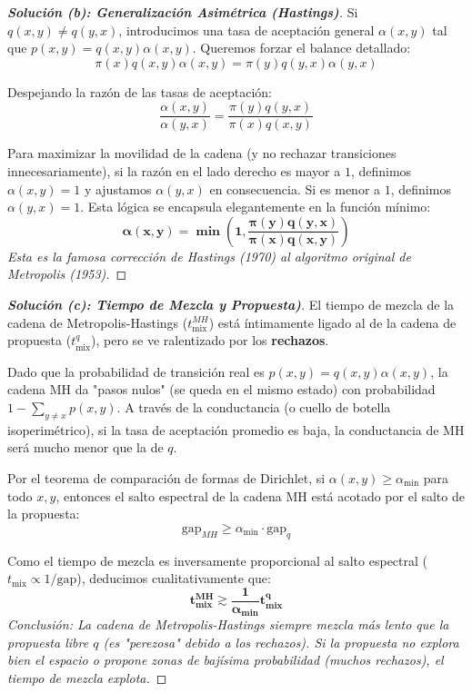 \documentclass[10pt,a4paper]{article}
\begin{document}
\vspace{5mm}

\begin{proof}[\textbf{Solución (b): Generalización Asimétrica (Hastings)}]
    Si $q(x,y) \neq q(y,x)$, introducimos una tasa de aceptación general $\alpha(x,y)$ tal que $p(x,y) = q(x,y)\alpha(x,y)$. Queremos forzar el balance detallado:
    \[ \pi(x) q(x,y) \alpha(x,y) = \pi(y) q(y,x) \alpha(y,x) \]
    
    Despejando la razón de las tasas de aceptación:
    \[ \frac{\alpha(x,y)}{\alpha(y,x)} = \frac{\pi(y) q(y,x)}{\pi(x) q(x,y)} \]
    
    Para maximizar la movilidad de la cadena (y no rechazar transiciones innecesariamente), si la razón en el lado derecho es mayor a $1$, definimos $\alpha(x,y) = 1$ y ajustamos $\alpha(y,x)$ en consecuencia. Si es menor a $1$, definimos $\alpha(y,x) = 1$. 
    Esta lógica se encapsula elegantemente en la función mínimo:
    \[ \mathbf{\alpha(x,y) = \min\left(1, \frac{\pi(y) q(y,x)}{\pi(x) q(x,y)}\right)} \]
    \textit{Esta es la famosa corrección de Hastings (1970) al algoritmo original de Metropolis (1953).}
\end{proof}

\vspace{5mm}

\begin{proof}[\textbf{Solución (c): Tiempo de Mezcla y Propuesta)}]
    El tiempo de mezcla de la cadena de Metropolis-Hastings ($t_{\text{mix}}^{MH}$) está íntimamente ligado al de la cadena de propuesta ($t_{\text{mix}}^{q}$), pero se ve ralentizado por los \textbf{rechazos}.
    
    Dado que la probabilidad de transición real es $p(x,y) = q(x,y)\alpha(x,y)$, la cadena MH da "pasos nulos" (se queda en el mismo estado) con probabilidad $1 - \sum_{y \neq x} p(x,y)$.
    A través de la conductancia (o cuello de botella isoperimétrico), si la tasa de aceptación promedio es baja, la conductancia de MH será mucho menor que la de $q$. 
    
    Por el teorema de comparación de formas de Dirichlet, si $\alpha(x,y) \ge \alpha_{\text{min}}$ para todo $x, y$, entonces el salto espectral de la cadena MH está acotado por el salto de la propuesta:
    \[ \text{gap}_{MH} \ge \alpha_{\text{min}} \cdot \text{gap}_q \]
    
    Como el tiempo de mezcla es inversamente proporcional al salto espectral ($t_{\text{mix}} \propto 1/\text{gap}$), deducimos cualitativamente que:
    \[ \mathbf{t_{\text{mix}}^{MH} \gtrsim \frac{1}{\alpha_{\text{min}}} t_{\text{mix}}^q} \]
    \textit{Conclusión: La cadena de Metropolis-Hastings siempre mezcla más lento que la propuesta libre $q$ (es "perezosa" debido a los rechazos). Si la propuesta no explora bien el espacio o propone zonas de bajísima probabilidad (muchos rechazos), el tiempo de mezcla explota.}
\end{proof}
\end{document}
